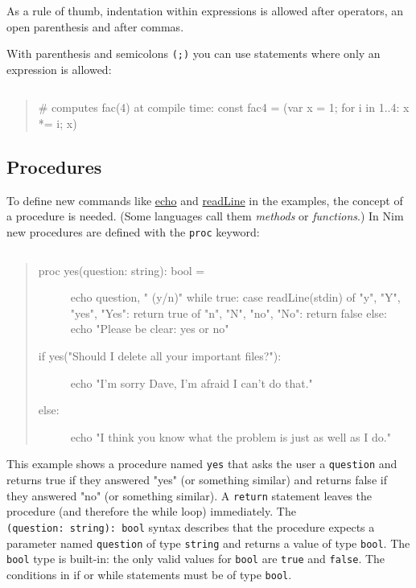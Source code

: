 As a rule of thumb, indentation within expressions is allowed after
operators, an open parenthesis and after commas.

With parenthesis and semicolons \texttt{(;)} you can use statements
where only an expression is allowed:

\begin{verbatim}
\end{verbatim}

\begin{quote}
\# computes fac(4) at compile time: const fac4 = (var x = 1; for i in
1..4: x *= i; x)
\end{quote}

\hypertarget{procedures}{%
\subsection{Procedures}\label{procedures}}

To define new commands like
\href{system.html\#echo,varargs\%5Btyped,\%5D}{echo} and
\href{io.html\#readLine,File}{readLine} in the examples, the concept of
a {procedure} is needed. (Some languages call them \emph{methods} or
\emph{functions}.) In Nim new procedures are defined with the
\texttt{proc} keyword:

\begin{verbatim}
\end{verbatim}

\begin{quote}
\begin{description}
\item[proc yes(question: string): bool =]
echo question, " (y/n)" while true: case readLine(stdin) of "y", "Y",
"yes", "Yes": return true of "n", "N", "no", "No": return false else:
echo "Please be clear: yes or no"
\item[if yes("Should I delete all your important files?"):]
echo "I'm sorry Dave, I'm afraid I can't do that."
\item[else:]
echo "I think you know what the problem is just as well as I do."
\end{description}
\end{quote}

This example shows a procedure named \texttt{yes} that asks the user a
\texttt{question} and returns true if they answered "yes" (or something
similar) and returns false if they answered "no" (or something similar).
A \texttt{return} statement leaves the procedure (and therefore the
while loop) immediately. The \texttt{(question:\ string):\ bool} syntax
describes that the procedure expects a parameter named \texttt{question}
of type \texttt{string} and returns a value of type \texttt{bool}. The
\texttt{bool} type is built-in: the only valid values for \texttt{bool}
are \texttt{true} and \texttt{false}. The conditions in if or while
statements must be of type \texttt{bool}.

